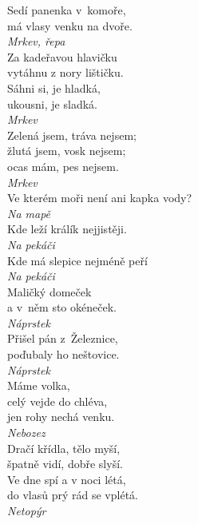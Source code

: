 \begin{multicols}{4}
\noindent
Sedí panenka v~komoře,\\
má vlasy venku na dvoře.\\[1 mm]
{\sl Mrkev, řepa}\\

\noindent
Za kadeřavou hlavičku\\
vytáhnu z nory lištičku.\\
Sáhni si, je hladká,\\
ukousni, je sladká.\\[1 mm]
{\sl Mrkev}\\

\noindent
Zelená jsem, tráva nejsem;\\
žlutá jsem, vosk nejsem;\\
ocas mám, pes nejsem.\\[1 mm]
{\sl Mrkev}\\

\noindent
Ve kterém moři není ani kapka vody?\\[1 mm]
{\sl Na mapě}\\

\noindent
Kde leží králík nejjistěji.\\[1 mm]
{\sl Na pekáči}\\

\noindent
Kde má slepice nejméně peří\\[1 mm]
{\sl Na pekáči}\\

\noindent
Maličký domeček\\
a v~něm sto okéneček.\\[1 mm]
{\sl Náprstek}\\

\noindent
Přišel pán z~Železnice,\\
poďubaly ho neštovice.\\[1 mm]
{\sl Náprstek}\\

\noindent
Máme volka,\\
celý vejde do chléva,\\
jen rohy nechá venku.\\[1 mm]
{\sl Nebozez}\\

\noindent
Dračí křídla, tělo myší,\\
špatně vidí, dobře slyší.\\
Ve dne spí a v noci létá,\\
do vlasů prý rád se vplétá.\\[1 mm]
{\sl Netopýr}\\


\end{multicols}
